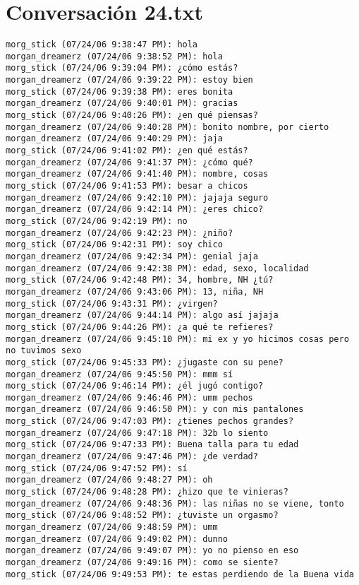 \section{Conversaci\'on 24.txt}

\begin{verbatim}
morg_stick (07/24/06 9:38:47 PM): hola
morgan_dreamerz (07/24/06 9:38:52 PM): hola
morg_stick (07/24/06 9:39:04 PM): ¿cómo estás?
morgan_dreamerz (07/24/06 9:39:22 PM): estoy bien
morg_stick (07/24/06 9:39:38 PM): eres bonita
morgan_dreamerz (07/24/06 9:40:01 PM): gracias
morg_stick (07/24/06 9:40:26 PM): ¿en qué piensas?
morgan_dreamerz (07/24/06 9:40:28 PM): bonito nombre, por cierto
morgan_dreamerz (07/24/06 9:40:29 PM): jaja
morg_stick (07/24/06 9:41:02 PM): ¿en qué estás?
morgan_dreamerz (07/24/06 9:41:37 PM): ¿cómo qué?
morgan_dreamerz (07/24/06 9:41:40 PM): nombre, cosas
morg_stick (07/24/06 9:41:53 PM): besar a chicos
morgan_dreamerz (07/24/06 9:42:10 PM): jajaja seguro
morgan_dreamerz (07/24/06 9:42:14 PM): ¿eres chico? 
morg_stick (07/24/06 9:42:19 PM): no
morgan_dreamerz (07/24/06 9:42:23 PM): ¿niño?
morg_stick (07/24/06 9:42:31 PM): soy chico
morgan_dreamerz (07/24/06 9:42:34 PM): genial jaja
morgan_dreamerz (07/24/06 9:42:38 PM): edad, sexo, localidad
morg_stick (07/24/06 9:42:48 PM): 34, hombre, NH ¿tú?
morgan_dreamerz (07/24/06 9:43:06 PM): 13, niña, NH
morg_stick (07/24/06 9:43:31 PM): ¿virgen?
morgan_dreamerz (07/24/06 9:44:14 PM): algo así jajaja
morg_stick (07/24/06 9:44:26 PM): ¿a qué te refieres?
morgan_dreamerz (07/24/06 9:45:10 PM): mi ex y yo hicimos cosas pero no tuvimos sexo
morg_stick (07/24/06 9:45:33 PM): ¿jugaste con su pene?
morgan_dreamerz (07/24/06 9:45:50 PM): mmm sí
morg_stick (07/24/06 9:46:14 PM): ¿él jugó contigo?
morgan_dreamerz (07/24/06 9:46:46 PM): umm pechos
morgan_dreamerz (07/24/06 9:46:50 PM): y con mis pantalones
morg_stick (07/24/06 9:47:03 PM): ¿tienes pechos grandes?
morgan_dreamerz (07/24/06 9:47:18 PM): 32b lo siento
morg_stick (07/24/06 9:47:33 PM): Buena talla para tu edad
morgan_dreamerz (07/24/06 9:47:46 PM): ¿de verdad?
morg_stick (07/24/06 9:47:52 PM): sí
morgan_dreamerz (07/24/06 9:48:27 PM): oh
morg_stick (07/24/06 9:48:28 PM): ¿hizo que te vinieras?
morgan_dreamerz (07/24/06 9:48:36 PM): las niñas no se viene, tonto
morg_stick (07/24/06 9:48:52 PM): ¿tuviste un orgasmo?
morgan_dreamerz (07/24/06 9:48:59 PM): umm
morgan_dreamerz (07/24/06 9:49:02 PM): dunno
morgan_dreamerz (07/24/06 9:49:07 PM): yo no pienso en eso
morgan_dreamerz (07/24/06 9:49:16 PM): como se siente?
morg_stick (07/24/06 9:49:53 PM): te estas perdiendo de la Buena vida

\end{verbatim}

